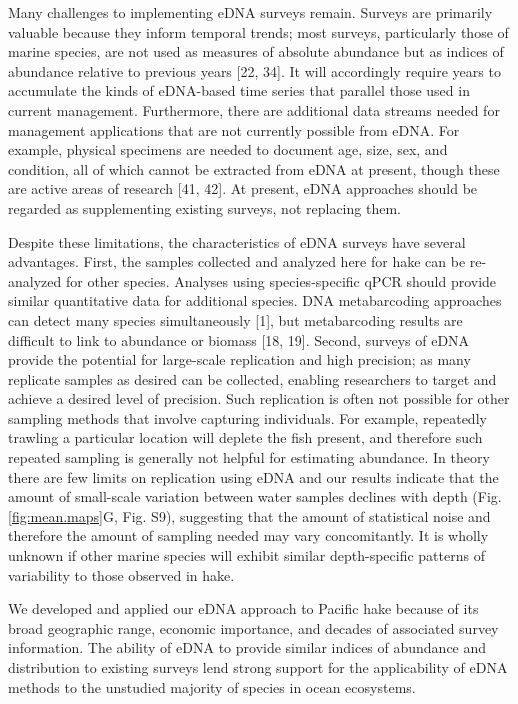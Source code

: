 \documentclass[
]{article}
\begin{document}
Many challenges to implementing eDNA surveys remain. Surveys are
primarily valuable because they inform temporal trends; most surveys,
particularly those of marine species, are not used as measures of
absolute abundance but as indices of abundance relative to previous
years {[}22, 34{]}. It will accordingly require years to accumulate the
kinds of eDNA-based time series that parallel those used in current management.
Furthermore, there are additional data streams needed for management
applications that are not currently possible from eDNA. For example,
physical specimens are needed to document age, size, sex, and condition,
all of which cannot be extracted from eDNA at present, though these are
active areas of research {[}41, 42{]}. At present, eDNA approaches should be
regarded as supplementing existing surveys, not replacing them.

Despite these limitations, the characteristics of eDNA surveys have
several advantages. First, the samples collected and analyzed here for
hake can be re-analyzed for other species. Analyses using
species-specific qPCR should provide similar quantitative data for
additional species. DNA metabarcoding approaches can detect many species simultaneously {[}1{]}, 
but metabarcoding results are difficult to
link to abundance or biomass {[}18, 19{]}. Second, surveys of eDNA provide
the potential for large-scale replication and high precision; as many
replicate samples as desired can be collected, enabling researchers to
target and achieve a desired level of precision. Such replication is often not
possible for other sampling methods that involve capturing individuals.
For example, repeatedly trawling a particular location will deplete the
fish present, and therefore such repeated sampling is generally not helpful for
estimating abundance. In theory there are few limits on replication
using eDNA and our results indicate that the amount of small-scale
variation between water samples declines with depth (Fig.
\ref{fig:mean.maps}G, Fig. S9), suggesting that the amount of
statistical noise and therefore the amount of sampling needed may vary
concomitantly. It is wholly unknown if other marine species will exhibit similar 
depth-specific patterns of variability to those observed in hake. 

We developed and applied our eDNA approach to Pacific hake because of
its broad geographic range, economic importance, and decades of
associated survey information. The ability of eDNA to provide similar
indices of abundance and distribution to existing surveys lend strong
support for the applicability of eDNA methods to the unstudied majority
of species in ocean ecosystems.
\end{document}
